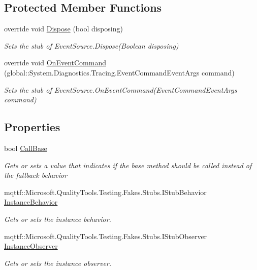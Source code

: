 \subsection*{Protected Member Functions}
\begin{DoxyCompactItemize}
\item 
override void \hyperlink{class_system_1_1_diagnostics_1_1_tracing_1_1_fakes_1_1_stub_event_source_a1009c29003a096026fd22d6b6e458907}{Dispose} (bool disposing)
\begin{DoxyCompactList}\small\item\em Sets the stub of Event\-Source.\-Dispose(\-Boolean disposing)\end{DoxyCompactList}\item 
override void \hyperlink{class_system_1_1_diagnostics_1_1_tracing_1_1_fakes_1_1_stub_event_source_a313e8f1ffb840be516769c2763c75aa0}{On\-Event\-Command} (global\-::\-System.\-Diagnostics.\-Tracing.\-Event\-Command\-Event\-Args command)
\begin{DoxyCompactList}\small\item\em Sets the stub of Event\-Source.\-On\-Event\-Command(\-Event\-Command\-Event\-Args command)\end{DoxyCompactList}\end{DoxyCompactItemize}
\subsection*{Properties}
\begin{DoxyCompactItemize}
\item 
bool \hyperlink{class_system_1_1_diagnostics_1_1_tracing_1_1_fakes_1_1_stub_event_source_a09f475c177032a6ff766b5bff99d4273}{Call\-Base}
\begin{DoxyCompactList}\small\item\em Gets or sets a value that indicates if the base method should be called instead of the fallback behavior\end{DoxyCompactList}\item 
mqttf\-::\-Microsoft.\-Quality\-Tools.\-Testing.\-Fakes.\-Stubs.\-I\-Stub\-Behavior \hyperlink{class_system_1_1_diagnostics_1_1_tracing_1_1_fakes_1_1_stub_event_source_a6ce59fa8e1d7c2e0fddbe4a90cd553ee}{Instance\-Behavior}
\begin{DoxyCompactList}\small\item\em Gets or sets the instance behavior.\end{DoxyCompactList}\item 
mqttf\-::\-Microsoft.\-Quality\-Tools.\-Testing.\-Fakes.\-Stubs.\-I\-Stub\-Observer \hyperlink{class_system_1_1_diagnostics_1_1_tracing_1_1_fakes_1_1_stub_event_source_ad7ef750d37fbfd4ca8a9ab7ec9469a84}{Instance\-Observer}
\begin{DoxyCompactList}\small\item\em Gets or sets the instance observer.\end{DoxyCompactList}\end{DoxyCompactItemize}


